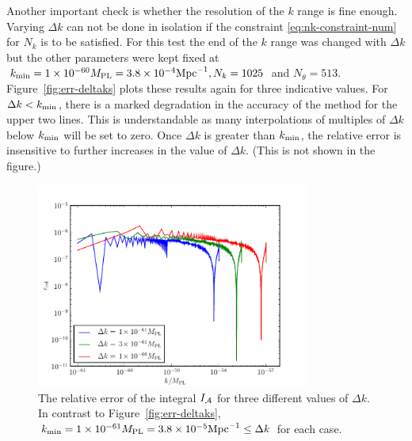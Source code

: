 Another important check is whether the resolution of the $k$ range is
fine enough. Varying $\Delta k$ can not be done in isolation if the
constraint \eqref{eq:nk-constraint-num} for $N_k$ is to
be satisfied. For this test the end of the $k$ range was changed with $\Delta k$
but the other parameters were kept fixed at $k_{\mathrm{min}}=1\times 10^{-60}M_{\mathrm{PL}}=3.8\times 10^{-4}\mathrm{Mpc}^{-1},
N_k = 1025$ and $N_\theta=513$. Figure~\ref{fig:err-deltaks} plots
these results again for three indicative values.  For $\Delta
k<k_{\mathrm{min}}$, there is a marked degradation in
the accuracy of the method for the upper two lines. This is understandable as many
interpolations of multiples of $\Delta k$ below $\kmin$ will be set to
zero. Once $\Delta k$ is greater than $\kmin$, the relative error is
insensitive to further increases in the value of $\Delta k$. (This is not shown in
the figure.)


\begin{figure}[htbp]
 \centering
 \includegraphics[width=0.8\textwidth]{numerical/graphs/err_deltak_kmin-large.pdf}
 \caption[Relative error of $I_\A$ with fixed $\kmin$]{The 
relative error of the integral $I_\A$ for three different values of $\Delta k$. In
contrast to Figure~\ref{fig:err-deltaks}, $k_{\mathrm{min}}=1\times 10^{-61}M_{\mathrm{PL}}=3.8\times 10^{-5}\mathrm{Mpc}^{-1} \le
\Delta k$ for each case.}
 \label{fig:err-deltak-kmin}
\end{figure}
 
